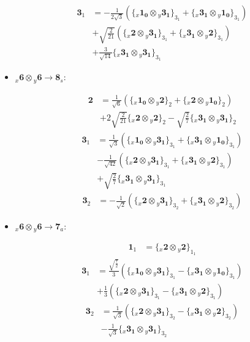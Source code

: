 \documentclass[english]{article}
\newcommand{\rep}[1]{\mathbf{#1}}
\newcommand{\repx}[2]{{}_{#2}\mathbf{#1}}
\newcommand{\tsprodx}[2]{\repx{#1}{x}\otimes\repx{#2}{y}}
\newcommand{\subcgs}[3]{\big\{ \tsprodx{#1}{#2}\big\}^{}_{#3}}
\begin{document}
\begin{itemize}
\begin{fleqn}
\begin{align*}
\rep{3}_{1} & = -\frac{1}{2 \sqrt{3}}\left(\subcgs{1_{0}}{3_{1}}{3_{1}}+\subcgs{3_{1}}{1_{0}}{3_{1}}\right) \\ 
 & +\sqrt{\frac{2}{21}}\left(\subcgs{2}{3_{1}}{3_{1}}+\subcgs{3_{1}}{2}{3_{1}}\right) \\ 
 & +\frac{3}{\sqrt{14}}\subcgs{3_{1}}{3_{1}}{3_{1}}
\end{align*}
\end{fleqn}
\item $\tsprodx{6}{6}\to\rep{8}_{s}$:
\begin{fleqn}
\begin{align*}
\rep{2} & = \frac{1}{\sqrt{6}}\left(\subcgs{1_{0}}{2}{2}+\subcgs{2}{1_{0}}{2}\right) \\ 
 & +2 \sqrt{\frac{2}{21}}\subcgs{2}{2}{2}-\sqrt{\frac{2}{7}}\subcgs{3_{1}}{3_{1}}{2}
\end{align*}
\begin{align*}
\rep{3}_{1} & = \frac{1}{\sqrt{3}}\left(\subcgs{1_{0}}{3_{1}}{3_{1}}+\subcgs{3_{1}}{1_{0}}{3_{1}}\right) \\ 
 & -\frac{1}{\sqrt{42}}\left(\subcgs{2}{3_{1}}{3_{1}}+\subcgs{3_{1}}{2}{3_{1}}\right) \\ 
 & +\sqrt{\frac{2}{7}}\subcgs{3_{1}}{3_{1}}{3_{1}}
\end{align*}
\begin{align*}
\rep{3}_{2} & = -\frac{1}{\sqrt{2}}\left(\subcgs{2}{3_{1}}{3_{2}}+\subcgs{3_{1}}{2}{3_{2}}\right)
\end{align*}
\end{fleqn}
\item $\tsprodx{6}{6}\to\rep{7}_{a}$:
\begin{fleqn}
\begin{align*}
\rep{1}_{1} & = \subcgs{2}{2}{1_{1}}
\end{align*}
\begin{align*}
\rep{3}_{1} & = \frac{\sqrt{\frac{7}{2}}}{3}\left(\subcgs{1_{0}}{3_{1}}{3_{1}}-\subcgs{3_{1}}{1_{0}}{3_{1}}\right) \\ 
 & +\frac{1}{3}\left(\subcgs{2}{3_{1}}{3_{1}}-\subcgs{3_{1}}{2}{3_{1}}\right)
\end{align*}
\begin{align*}
\rep{3}_{2} & = \frac{1}{\sqrt{3}}\left(\subcgs{2}{3_{1}}{3_{2}}-\subcgs{3_{1}}{2}{3_{2}}\right) \\ 
 & -\frac{1}{\sqrt{3}}\subcgs{3_{1}}{3_{1}}{3_{2}}
\end{align*}
\end{fleqn}

\end{itemize}
\end{document}
